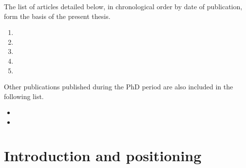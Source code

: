 \documentclass[
	11pt, %
	a4paper,
]{LegrandOrangeBook}
\begin{document}
The list of articles detailed below, in chronological order by date of publication, form the basis of the present thesis.
\vspace{0.5 cm}

\begin{enumerate}
	\item {}
	\vspace{0.5 cm}
	\item {}
	\vspace{0.5 cm}
	\item {}
	\vspace{0.5 cm}
	\item {}
	\vspace{0.5 cm}
	\item {}
	\vspace{0.5 cm}
\end{enumerate}

\vfill
\pagebreak
Other publications published during the PhD period are also included in the following list.

\vspace{0.5 cm}
\begin{itemize}
	\item {}
	\vspace{0.5 cm}
	\item {}
	\vspace{0.5 cm}
\end{itemize}

\chapterspaceabove{6.75cm}
\chapterspacebelow{7.25cm}

\chapter{Introduction and positioning}
%

\chapterspaceabove{6.75cm}
\chapterspacebelow{7.25cm}
\end{document}
